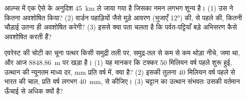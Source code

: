 \begin{exercise}[$\star\star\star$]\label{exo:g12:mountain-building:14}
आल्प्स में एक  ऐसे  के अनुदिश \qty{45}{km} ले जाया गया है जिसका नमन
लगभग शून्य है। (1) उस  ने कितना  अवशोषित किया? (2) वार्डन पहाड़ियों
जैसे मुड़े आवरण (भुजाएँ \ang{12}) की,  से पहले की, कितनी चौड़ाई
उतना ही  अवशोषित करेगी? (3) इससे क्या पता चलता है कि
पर्वत-पट्टियाँ बड़े अभिसरण कैसे अवशोषित करती हैं?
\end{exercise}

\begin{exercise}[$\star\star\star$]\label{exo:g12:mountain-building:15}
एवरेस्ट की चोटी का चूना पत्थर किसी समुद्री तली पर, समुद्र-तल से कम से कम
थोड़ा नीचे, जमा था, और आज \qty{8848.86}{m} पर खड़ा है। (1) यह मानकर कि
टक्कर 50 मिलियन वर्ष पहले शुरू हुई, उत्थान की न्यूनतम माध्य
दर, \unit{mm} प्रति वर्ष में, क्या है? (2) इसकी तुलना 40 मिलियन वर्ष पहले से भारत की
चाल, प्रति वर्ष लगभग \qty{40}{mm}, से कीजिए। (3) चट्टान का उत्थान
संभवतः उसकी वर्तमान ऊँचाई से अधिक क्यों है?
\end{exercise}

